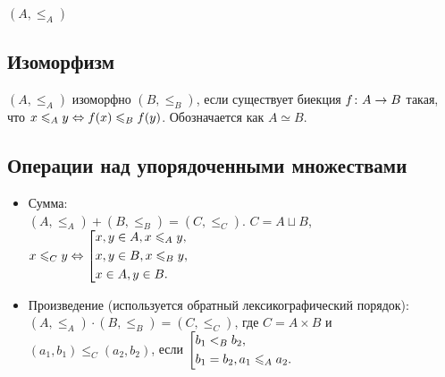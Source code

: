 \begin{example}
	$(A, \le_A)$
\end{example}


\subsection{Изоморфизм}

\begin{definition}
	$(A, \le_A)$ изоморфно $(B, \le_B)$, если существует биекция $f \colon A \rightarrow B$ такая, что $x \leqslant_A y \Leftrightarrow f(x) \leqslant_B f(y)$. Обозначается как $A \simeq B$.
\end{definition}

\subsection{Операции над упорядоченными множествами}

\begin{itemize}
	\item Сумма: \\
	$(A, \le_A) + (B, \le_B) = (C, \le_C)$. $C = A \sqcup B$, $x \leqslant_C y \Leftrightarrow \left[\begin{aligned}&{x, y \in A, x \leqslant_A y,} \\ &{x, y \in B, x \leqslant_B y,} \\ &{x \in A, y \in B.}\end{aligned}\right.$ %
	
	\item Произведение (используется обратный лексикографический порядок): \\
	$(A, \le_A) \cdot (B, \le_B) = (C, \le_C)$, где $C = A \times B$ и $(a_1, b_1) \le_C (a_2, b_2)$, если $\left[\begin{aligned}&{b_1 <_B b_2,} \\ &{b_1 = b_2, a_1 \leqslant_A a_2}.\end{aligned}\right.$
\end{itemize}